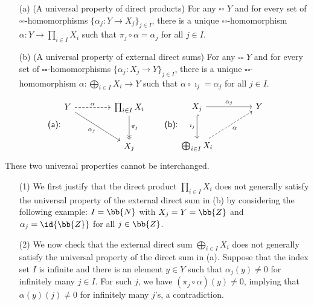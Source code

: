 \begin{rmk}
    \begin{enumerate}
        \item[(a)]
        {
            (A universal property of direct products)
            For any $\square\square$ $Y$ and for every set of $\square\square$-homomorphisms $\{\alpha_j: Y\rightarrow X_j\}_{j\in I}$, there is a unique $\square\square$-homomorphism $\alpha: Y\rightarrow\prod_{i\in I} X_i$ such that $\pi_j\circ\alpha=\alpha_j$ for all $j\in I$.
        }
        \item[(b)]
        {
            (A universal property of external direct sums)
            For any $\square\square$ $Y$ and for every set of $\square\square$-homomorphisms $\{\alpha_j: X_j\rightarrow Y\}_{j\in I}$, there is a unique $\square\square$-homomorphism $\alpha: \bigoplus_{i\in I} X_i\rightarrow Y$ such that $\alpha\circ\imath_j=\alpha_j$ for all $j\in I$.
        }
    \end{enumerate}
    \begin{equation*}
    \textsf{(a):}
    \begin{tikzcd}[row sep=1.0cm, column sep=1.5cm]
        Y\arrow[r, "\alpha", dashed]\arrow[dr, "\alpha_j"']
        &
        \prod_{i\in I} X_i\arrow[d, "\pi_j", ->>]
        \\
        &
        X_j
    \end{tikzcd}
    \quad\quad\textsf{(b):}
    \begin{tikzcd}[row sep=1.0cm, column sep=1.5cm]
        X_j\arrow[r, "\alpha_j"]\arrow[d, "\imath_j"', hook]
        &
        Y
        \\
        \bigoplus_{i\in I} X_i\arrow[ur, "\alpha"', dashed]
        &
    \end{tikzcd}
    \end{equation*}
    These two universal properties cannot be interchanged.
    \begin{enumerate}
        \item[(1)]
        {
            We first justify that the direct product $\prod_{i\in I} X_i$ does not generally satisfy the universal property of the external direct sum in (b) by considering the following example: $I=\bb{N}$ with $X_j=Y=\bb{Z}$ and $\alpha_j=\id{\bb{Z}}$ for all $j\in\bb{Z}$.
        }
        \item[(2)]
        {
            We now check that the external direct sum $\bigoplus_{i\in I} X_i$ does not generally satisfy the universal property of the direct sum in (a).
            Suppose that the index set $I$ is infinite and there is an element $y\in Y$ such that $\alpha_j(y)\neq 0$ for infinitely many $j\in I$.
            For such $j$, we have $(\pi_j\circ\alpha)(y)\neq 0$, implying that $\alpha(y)(j)\neq 0$ for infinitely many $j$'s, a contradiction.
        }
    \end{enumerate}
\end{rmk}

